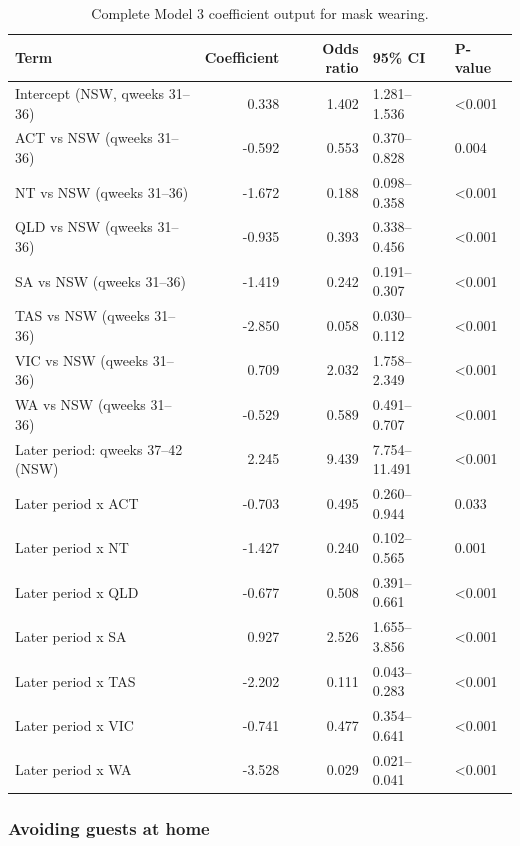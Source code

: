 \documentclass[
  12pt,
  a4paper,
]{article}
\begin{document}
\begin{longtable}[t]{lrrll}
\caption{\label{tab:model3-mask-appendix}Complete Model 3 coefficient output for mask wearing.}\\
\toprule
Term & Coefficient & Odds ratio & 95\% CI & P-value\\
\midrule
Intercept (NSW, qweeks 31--36) & 0.338 & 1.402 & 1.281--1.536 & <0.001\\
ACT vs NSW (qweeks 31--36) & -0.592 & 0.553 & 0.370--0.828 & 0.004\\
NT vs NSW (qweeks 31--36) & -1.672 & 0.188 & 0.098--0.358 & <0.001\\
QLD vs NSW (qweeks 31--36) & -0.935 & 0.393 & 0.338--0.456 & <0.001\\
SA vs NSW (qweeks 31--36) & -1.419 & 0.242 & 0.191--0.307 & <0.001\\
\addlinespace
TAS vs NSW (qweeks 31--36) & -2.850 & 0.058 & 0.030--0.112 & <0.001\\
VIC vs NSW (qweeks 31--36) & 0.709 & 2.032 & 1.758--2.349 & <0.001\\
WA vs NSW (qweeks 31--36) & -0.529 & 0.589 & 0.491--0.707 & <0.001\\
Later period: qweeks 37--42 (NSW) & 2.245 & 9.439 & 7.754--11.491 & <0.001\\
Later period x ACT & -0.703 & 0.495 & 0.260--0.944 & 0.033\\
\addlinespace
Later period x NT & -1.427 & 0.240 & 0.102--0.565 & 0.001\\
Later period x QLD & -0.677 & 0.508 & 0.391--0.661 & <0.001\\
Later period x SA & 0.927 & 2.526 & 1.655--3.856 & <0.001\\
Later period x TAS & -2.202 & 0.111 & 0.043--0.283 & <0.001\\
Later period x VIC & -0.741 & 0.477 & 0.354--0.641 & <0.001\\
\addlinespace
Later period x WA & -3.528 & 0.029 & 0.021--0.041 & <0.001\\
\bottomrule
\end{longtable}

\clearpage

\subsubsection{Avoiding guests at home}\label{avoiding-guests-at-home}
\end{document}

